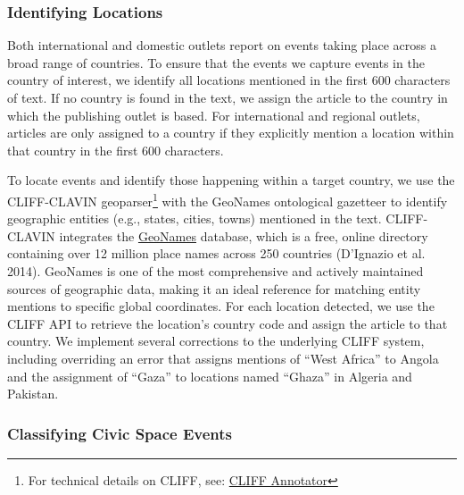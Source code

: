 \documentclass[
  letterpaper,
  DIV=11,
  numbers=noendperiod]{scrartcl}
\begin{document}
\hypertarget{identifying-locations}{%
\subsubsection{Identifying Locations}\label{identifying-locations}}

Both international and domestic outlets report on events taking place
across a broad range of countries. To ensure that the events we capture
events in the country of interest, we identify all locations mentioned
in the first 600 characters of text. If no country is found in the text,
we assign the article to the country in which the publishing outlet is
based. For international and regional outlets, articles are only
assigned to a country if they explicitly mention a location within that
country in the first 600 characters.

To locate events and identify those happening within a target country,
we use the CLIFF-CLAVIN geoparser\footnote{For technical details on
  CLIFF, see: \href{https://github.com/mediacloud/cliff-annotator}{CLIFF
  Annotator}} with the GeoNames ontological gazetteer to identify
geographic entities (e.g., states, cities, towns) mentioned in the text.
CLIFF-CLAVIN integrates the \href{https://www.geonames.org/}{GeoNames}
database, which is a free, online directory containing over 12 million
place names across 250 countries (D'Ignazio et al. 2014). GeoNames is
one of the most comprehensive and actively maintained sources of
geographic data, making it an ideal reference for matching entity
mentions to specific global coordinates. For each location detected, we
use the CLIFF API to retrieve the location's country code and assign the
article to that country. We implement several corrections to the
underlying CLIFF system, including overriding an error that assigns
mentions of \enquote{West Africa} to Angola and the assignment of
\enquote{Gaza} to locations named \enquote{Ghaza} in Algeria and
Pakistan.

\hypertarget{classifying-civic-space-events}{%
\subsubsection{Classifying Civic Space
Events}\label{classifying-civic-space-events}}
\end{document}
